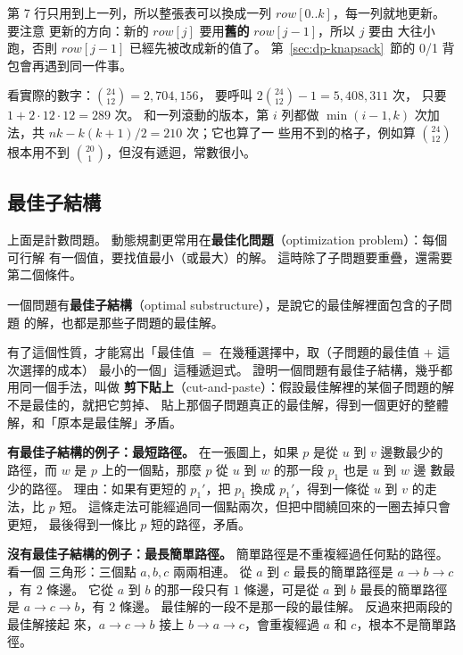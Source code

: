 第 7 行只用到上一列，所以整張表可以換成一列 $\mathit{row}[0..k]$，每一列就地更新。 要注意
更新的方向：新的 $\mathit{row}[j]$ 要用\textbf{舊的} $\mathit{row}[j - 1]$，所以 $j$ 要由
大往小跑，否則 $\mathit{row}[j - 1]$ 已經先被改成新的值了。 第~\ref{sec:dp-knapsack}~節的
0/1 背包會再遇到同一件事。

看實際的數字：$\binom{24}{12} = 2{,}704{,}156$， 要呼叫
$2\binom{24}{12} - 1 = 5{,}408{,}311$ 次， 只要 $1 + 2 \cdot 12 \cdot 12 = 289$
次。  和一列滾動的版本，第 $i$ 列都做 $\min(i - 1, k)$ 次加法，共 $nk - k(k+1)/2 = 210$ 次；它也算了一
些用不到的格子，例如算 $\binom{24}{12}$ 根本用不到 $\binom{20}{1}$，但沒有遞迴，常數很小。

\subsection{最佳子結構}
\label{sec:dp-substructure}

上面是計數問題。 動態規劃更常用在\textbf{最佳化問題}（optimization problem）：每個可行解
有一個值，要找值最小（或最大）的解。 這時除了子問題要重疊，還需要第二個條件。

\begin{definition}[最佳子結構]
\label{def:dp-substructure}
一個問題有\textbf{最佳子結構}（optimal substructure），是說它的最佳解裡面包含的子問題
的解，也都是那些子問題的最佳解。
\end{definition}

有了這個性質，才能寫出「最佳值 $=$ 在幾種選擇中，取（子問題的最佳值 $+$ 這次選擇的成本）
最小的一個」這種遞迴式。 證明一個問題有最佳子結構，幾乎都用同一個手法，叫做
\textbf{剪下貼上}（cut-and-paste）：假設最佳解裡的某個子問題的解不是最佳的，就把它剪掉、
貼上那個子問題真正的最佳解，得到一個更好的整體解，和「原本是最佳解」矛盾。

\textbf{有最佳子結構的例子：最短路徑。} 在一張圖上，如果 $p$ 是從 $u$ 到 $v$ 邊數最少的
路徑，而 $w$ 是 $p$ 上的一個點，那麼 $p$ 從 $u$ 到 $w$ 的那一段 $p_1$ 也是 $u$ 到 $w$ 邊
數最少的路徑。 理由：如果有更短的 $p_1'$，把 $p_1$ 換成 $p_1'$，得到一條從 $u$ 到 $v$
的走法，比 $p$ 短。 這條走法可能經過同一個點兩次，但把中間繞回來的一圈去掉只會更短，
最後得到一條比 $p$ 短的路徑，矛盾。

\textbf{沒有最佳子結構的例子：最長簡單路徑。} 簡單路徑是不重複經過任何點的路徑。 看一個
三角形：三個點 $a, b, c$ 兩兩相連。 從 $a$ 到 $c$ 最長的簡單路徑是 $a \to b \to c$，有
$2$ 條邊。 它從 $a$ 到 $b$ 的那一段只有 $1$ 條邊，可是從 $a$ 到 $b$ 最長的簡單路徑是
$a \to c \to b$，有 $2$ 條邊。 最佳解的一段不是那一段的最佳解。 反過來把兩段的最佳解接起
來，$a \to c \to b$ 接上 $b \to a \to c$，會重複經過 $a$ 和 $c$，根本不是簡單路徑。

